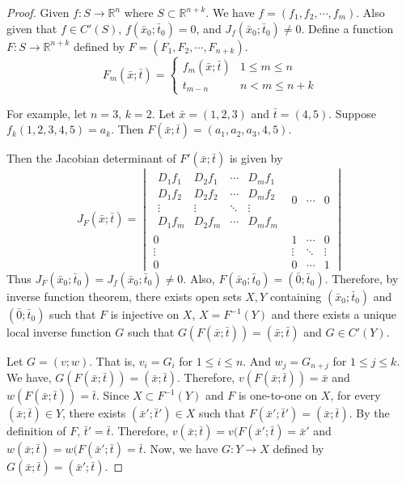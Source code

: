 \begin{proof}
	Given $f : S \to \mathbb{R}^n$ where $S \subset \mathbb{R}^{n+k}$.
	We have $f = (f_1,f_2,\cdots,f_m)$.
	Also given that $f \in C'(S)$, $f(\bar{x}_0;\bar{t}_0) = 0$, and $J_f(\bar{x}_0;\bar{t}_0) \ne 0$.
	Define a function $F : S \to \mathbb{R}^{n+k}$ defined by $F = (F_1,F_2,\cdots,F_{n+k})$.
	$$ F_m(\bar{x};\bar{t}) = \begin{cases}
		f_m(\bar{x};\bar{t}) & 1 \le m \le n\\
		t_{m-n} & n < m \le n+k
	\end{cases} $$
	\begin{commentary}
		For example, let $n = 3$, $k = 2$.
		Let $\bar{x} = (1,2,3)$ and $\bar{t} = (4,5)$.
		Suppose $f_k(1,2,3,4,5) = a_k$.
		Then $F(\bar{x};\bar{t}) = (a_1,a_2,a_3,4,5)$.
	\end{commentary}

	Then the Jacobian determinant of $F'(\bar{x};\bar{t})$ is given by
	$$ J_F(\bar{x};\bar{t}) = \begin{vmatrix}
		\begin{matrix}
			D_1f_1 & D_2f_1 & \cdots & D_mf_1 \\
			D_1f_2 & D_2f_2 & \cdots & D_mf_2 \\
			\vdots & \vdots & \ddots & \vdots \\
			D_1f_m & D_2f_m & \cdots & D_mf_m
		\end{matrix}
		& 0 & \cdots & 0 \\
		0 & 1 & \cdots & 0 \\
		\vdots & \vdots & \ddots & \vdots \\
		0 & 0 & \cdots & 1 
	\end{vmatrix} $$
	Thus $J_F(\bar{x}_0;\bar{t}_0) = J_f(\bar{x}_0;\bar{t}_0) \ne 0$.
	Also, $F(\bar{x}_0;\bar{t}_0) = (\bar{0};\bar{t}_0)$.
	Therefore, by inverse function theorem, there exists open sets $X,Y$ containing $(\bar{x}_0;\bar{t}_0)$ and $(\bar{0};\bar{t}_0)$ such that $F$ is injective on $X$, $X = F^{-1}(Y)$ and there exists a unique local inverse function $G$ such that $G(F(\bar{x};\bar{t})) = (\bar{x};\bar{t})$ and $G \in C'(Y)$.

	Let $G = (v;w)$.
	That is, $v_i = G_i$ for $1 \le i \le n$.
	And $w_j = G_{n+j}$ for $1 \le j \le k$.
	We have, $G(F(\bar{x};\bar{t})) = (\bar{x};\bar{t})$.
	Therefore, $v(F(\bar{x};\bar{t})) = \bar{x}$ and $w(F(\bar{x};\bar{t})) = \bar{t}$.
	Since $X \subset F^{-1}(Y)$ and $F$ is one-to-one on $X$, for every $(\bar{x};\bar{t}) \in Y$, there exists $(\bar{x}';\bar{t}') \in X$ such that $F(\bar{x}';\bar{t}') = (\bar{x};\bar{t})$.
	By the definition of $F$, $\bar{t}' = \bar{t}$.
	Therefore, $v(\bar{x};\bar{t}) = v(F(\bar{x}';\bar{t}) = \bar{x}'$ and $w(\bar{x};\bar{t}) = w(F(\bar{x}';\bar{t}) = \bar{t}$.
	Now, we have $G : Y \to X$ defined by $G(\bar{x};\bar{t}) = (\bar{x}';\bar{t})$.


\end{proof}
